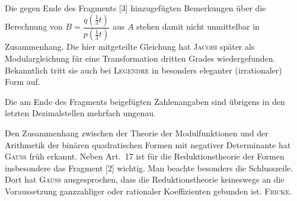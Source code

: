 Die gegen Ende des Fragments [3] hinzugefügten Bemerkungen über die Berechnung von $B = \dfrac{q(\frac13 t)}{p(\frac13 t)}$ aus $A$ stehen damit nicht unmittelbar in Zusammenhang. Die hier mitgeteilte Gleichung hat \textsc{Jacobi} später als Modulargleichung für eine Transformation dritten Grades wiedergefunden. Bekanntlich tritt sie auch bei \textsc{Legendre} in besonders eleganter (irrationaler) Form auf.

Die am Ende des Fragments beigefügten Zahlenangaben sind übrigens in den letzten Dezimalstellen mehrfach ungenau.

Den Zusammenhang zwischen der Theorie der Modulfunktionen und der Arithmetik der binären quadratischen Formen mit negativer Determinante hat \textsc{Gauss} früh erkannt. Neben Art.~17 ist für die Reduktionstheorie der Formen insbesondere das Fragment [2] wichtig. Man beachte besonders die Schlusszeile. Dort hat \textsc{Gauss} ausgesprochen, dass die Reduktionstheorie keineswegs an die Voraussetzung ganzzahliger oder rationaler Koeffizienten gebunden ist. \hfill \textsc{Fricke}.
